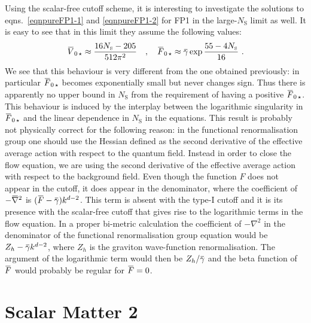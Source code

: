 \documentclass[11pt]{book} %
\newcommand{\overbar}[1]{\mkern 1.5mu\overline{\mkern-1.5mu#1\mkern-1.5mu}\mkern 1.5mu}
\newcommand\NS{ N_{\scriptscriptstyle{\mathrm{S}}} }
\newcommand{\bnabla}{\overbar \nabla}
\newcommand{\bV}{\overbar V}
\newcommand{\bF}{\overbar F}
\newcommand{\bg}{\overbar \gamma}
\numberwithin{equation}{chapter}
\begin{document}
Using the scalar-free cutoff scheme, it is interesting to investigate the solutions to
eqns.~\eqref{eqnpureFP1-1} and \eqref{eqnpureFP1-2} for FP1 in the large-$\NS$ limit as well.
It is easy to see that in this limit they assume the following values:
\begin{align}
  \bV_{0 \, \star} \approx \frac{ 16 \NS - 205 }{ 512 \pi^2 } \quad , \quad
  \bF_{0 \, \star} \approx \bg\exp{\frac{ 55 - 4 \NS }{16}}\ .
\end{align}
We see that this behaviour is very different from the one obtained previously:
in particular $\bF_{0 \, \star}$ becomes exponentially small but never changes sign.
Thus there is apparently no upper bound in $\NS$ from the requirement of having a positive $\bF_{0 \, \star}$.
This behaviour is induced by the interplay between the logarithmic singularity
in $\bF_{0 \, \star}$ and the linear dependence in $\NS$ in the equations.
This result is probably not physically correct for the following
reason: in the functional renormalisation group one should use the Hessian defined as the second
derivative of the effective average action with respect to the quantum field.
Instead in order to close the flow equation,
we are using the second derivative of the
effective average action with respect to the background field.
Even though the function $F$ does not appear in the cutoff,
it does appear in the denominator, where the coefficient
of $-\bnabla^2$ is $(\bF-\bg) k^{d-2}$.
This term is absent with the type-I cutoff and
it is its presence with the scalar-free cutoff that gives rise
to the logarithmic terms in the flow equation.
In a proper bi-metric calculation the coefficient of
$-\nabla^2$ in the denominator of the functional renormalisation group equation
would be $Z_h-\bg k^{d-2}$, where $Z_h$ is the graviton
wave-function renormalisation.
The argument of the logarithmic term would then be $Z_h/\bg$
and the beta function of $\bF$ would probably be regular for $\bF=0$.




\chapter{Scalar Matter 2}
\label{ch:astrid}
\end{document}
